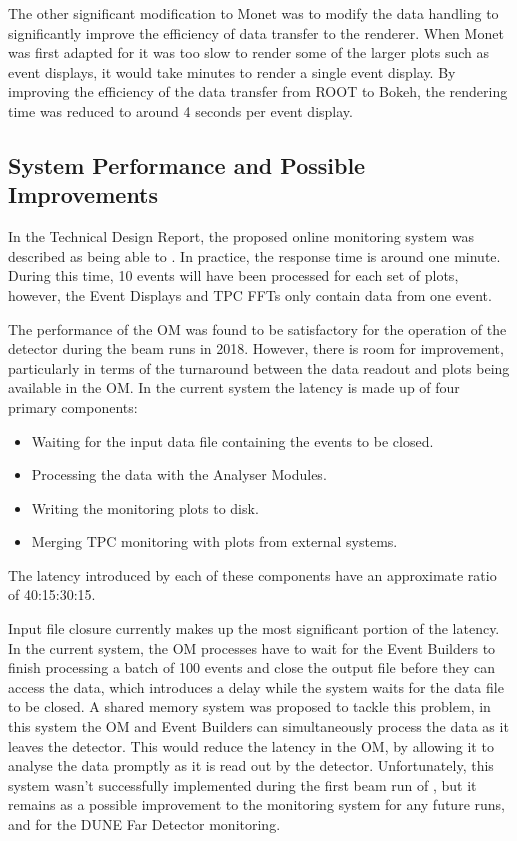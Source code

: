 The other significant modification to Monet was to modify the data handling to 
significantly improve the efficiency of data transfer to the renderer.
When Monet was first adapted for \protodune{} it was too slow to render some 
of the larger plots such as event displays, it would take minutes to render a 
single event display. By improving the efficiency of the data transfer from ROOT
to Bokeh, the rendering time was reduced to around 4 seconds per event display.

\subsection{System Performance and Possible Improvements}
In the \protodune{} Technical Design Report\cite{Abi:2017aow}, the proposed 
online monitoring system was described as being able to . In practice, the response time is around one 
minute. During this time, 10 events will have been processed for each set of 
plots, however, the Event Displays and TPC FFTs only contain data from one 
event.

The performance of the OM was found to be satisfactory for the operation of the
\protodune{} detector during the beam runs in 2018. However, there is room for
improvement, particularly in terms of the turnaround between the data readout 
and plots being available in the OM. In the current system the latency is made 
up of four primary components:
\begin{itemize}
	\item Waiting for the input data file containing the events to be closed.
	\item Processing the data with the Analyser Modules.
	\item Writing the monitoring plots to disk.
	\item Merging TPC monitoring with plots from external systems.
\end{itemize}
The latency introduced by each of these components have an approximate ratio of 
40:15:30:15. 

Input file closure currently makes up the most significant portion 
of the latency. In the current system, the OM processes have to wait for the 
Event Builders to finish processing a batch of 100 events and close the output 
file before they can access the data, which introduces a delay while the system
waits for the data file to be closed. A shared memory system was proposed to 
tackle this problem, in this system the OM and Event Builders can 
simultaneously process the data as it leaves the detector.  This would reduce 
the latency in the OM, by allowing it to analyse the data promptly as it is 
read out by the detector. Unfortunately, this system wasn't successfully 
implemented during the first beam run of \protodune{}, but it remains as a 
possible improvement to the monitoring system for any future \protodune{} 
runs, and for the DUNE Far Detector monitoring.

